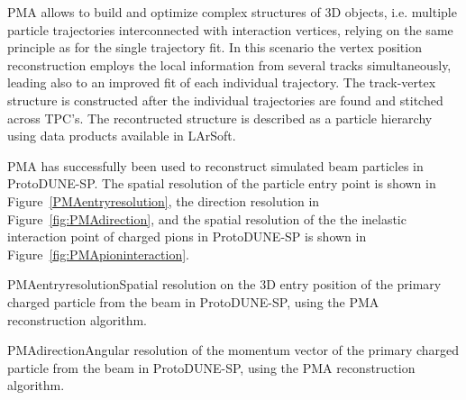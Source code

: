 PMA allows to build and optimize complex structures of 3D objects, i.e. multiple particle trajectories
interconnected with interaction vertices, relying on the same principle as for the single trajectory fit.
In this scenario the vertex position reconstruction employs the local information from several tracks
simultaneously, leading also to an improved fit of each individual trajectory. The track-vertex structure
is constructed after the individual trajectories are found and stitched across TPC's. The recontructed
structure is described as a particle hierarchy using data products available in LArSoft.

PMA has successfully been used to reconstruct simulated beam particles in
ProtoDUNE-SP. The spatial resolution of the particle entry point is
shown in Figure~\ref{PMAentryresolution}, the direction resolution in
Figure~\ref{fig:PMAdirection}, and the spatial resolution of the the
inelastic interaction point of charged pions in ProtoDUNE-SP is shown
in Figure~\ref{fig:PMApioninteraction}.

\begin{cdrfigure}{PMAentryresolution}{Spatial resolution on the 3D entry position of the primary
  charged particle from the beam in ProtoDUNE-SP, using the PMA
  reconstruction algorithm.}
\end{cdrfigure}

\begin{cdrfigure}{PMAdirection}{Angular resolution of the momentum vector of the primary
  charged particle from the beam in ProtoDUNE-SP, using the PMA
  reconstruction algorithm.}
\end{cdrfigure}



